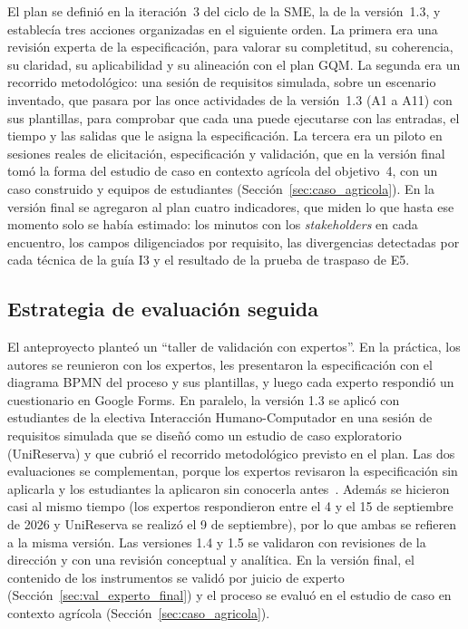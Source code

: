 \documentclass[12pt,letterpaper,oneside]{report}
\begin{document}
El plan se definió en la iteración~3 del ciclo de la SME, la de la versión~1.3, y establecía tres acciones organizadas en el siguiente orden. La primera era una revisión experta de
la especificación, para valorar su completitud, su coherencia, su claridad, su
aplicabilidad y su alineación con el plan GQM. La segunda era un recorrido
metodológico: una sesión de requisitos simulada, sobre un escenario inventado,
que pasara por las once actividades de la versión~1.3 (A1 a A11) con sus
plantillas, para comprobar que cada una puede ejecutarse con las entradas, el
tiempo y las salidas que le asigna la especificación. La tercera era un piloto en sesiones reales de
elicitación, especificación y validación, que en la versión final tomó la forma
del estudio de caso en contexto agrícola del objetivo~4, con un caso construido
y equipos de estudiantes (Sección~\ref{sec:caso_agricola}). En la versión final se agregaron al plan cuatro indicadores, que miden lo que
hasta ese momento solo se había estimado:
los minutos con los \textit{stakeholders} en cada encuentro, los campos
diligenciados por requisito, las divergencias detectadas por cada técnica de la
guía I3 y el resultado de la prueba de traspaso de E5.

\subsection{Estrategia de evaluación seguida}
\label{sec:estrategia}
El anteproyecto planteó un ``taller de validación con expertos''. En la práctica, los autores se reunieron con los expertos, les
presentaron la especificación con el diagrama BPMN del proceso y sus plantillas, y
luego cada experto respondió un cuestionario en Google Forms. En paralelo, la versión 1.3 se aplicó con
estudiantes de la electiva Interacción Humano-Computador en una sesión de
requisitos simulada que se diseñó como
un estudio de caso exploratorio (UniReserva) y que cubrió el recorrido
metodológico previsto en el plan. Las dos evaluaciones se complementan, porque los expertos revisaron la
especificación sin aplicarla y los estudiantes la aplicaron sin conocerla
antes~\cite{escobar2008validez,runeson2009case}. Además se hicieron casi al
mismo tiempo (los expertos respondieron entre el 4 y el 15 de
septiembre de 2026 y UniReserva se realizó el 9 de septiembre), por lo que ambas
se refieren a la misma versión. Las versiones 1.4 y 1.5 se validaron con
revisiones de la dirección y con una revisión conceptual y analítica. En la
versión final, el contenido de los instrumentos se validó por juicio de experto
(Sección~\ref{sec:val_experto_final}) y el proceso se evaluó en el estudio de
caso en contexto agrícola (Sección~\ref{sec:caso_agricola}).
\end{document}
